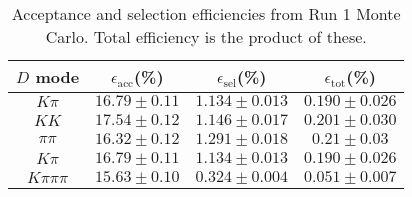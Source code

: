 \begin{table}[H]
    \centering
    \begin{tabular}{cccc}
        \toprule
        $D$ mode & $\epsilon_\mathrm{acc}$(\%) &  $\epsilon_\mathrm{sel}$(\%) &  $\epsilon_\mathrm{tot}$(\%) \\
        \midrule
        $K\pi$ & $16.79 \pm 0.11$ & $1.134 \pm 0.013$ & $0.190 \pm 0.026$ \\
        $KK$ & $17.54 \pm 0.12$ & $1.146 \pm 0.017$ & $0.201 \pm 0.030$ \\
        $\pi\pi$ & $16.32 \pm 0.12$ & $1.291 \pm 0.018$ & $0.21 \pm 0.03$ \\
        $K\pi$ & $16.79 \pm 0.11$ & $1.134 \pm 0.013$ & $0.190 \pm 0.026$ \\
        $K\pi\pi\pi$ & $15.63 \pm 0.10$ & $0.324 \pm 0.004$ & $0.051 \pm 0.007$ \\
        \bottomrule
    \end{tabular}
    \caption{Acceptance and selection efficiencies from  Run 1 Monte Carlo. Total efficiency is the  product of these.}
\label{tab:selection_efficiency_run1}
\end{table}
